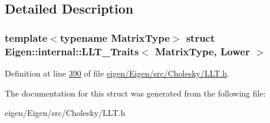 \subsection{Detailed Description}
\subsubsection*{template$<$typename Matrix\+Type$>$\newline
struct Eigen\+::internal\+::\+L\+L\+T\+\_\+\+Traits$<$ Matrix\+Type, Lower $>$}



Definition at line \hyperlink{eigen_2_eigen_2src_2_cholesky_2_l_l_t_8h_source_l00390}{390} of file \hyperlink{eigen_2_eigen_2src_2_cholesky_2_l_l_t_8h_source}{eigen/\+Eigen/src/\+Cholesky/\+L\+L\+T.\+h}.



The documentation for this struct was generated from the following file\+:\begin{DoxyCompactItemize}
\item 
eigen/\+Eigen/src/\+Cholesky/\+L\+L\+T.\+h\end{DoxyCompactItemize}
